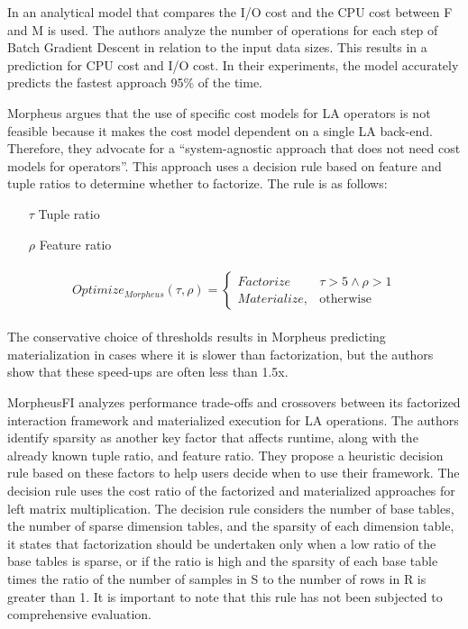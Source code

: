 In \cite{orion_learning_gen_lin_models} an analytical model that compares the I/O cost and the CPU cost between F and M is used. The authors analyze the number of operations for each step of Batch Gradient Descent in relation to the input data sizes. This results in a prediction for CPU cost and I/O cost. In their experiments, the model accurately predicts the fastest approach 95\% of the time.

Morpheus \cite{morpheus} argues that the use of specific cost models for LA operators is not feasible because it makes the cost model dependent on a single LA back-end. Therefore, they advocate for a “system-agnostic approach that does not need cost models for operators”. This approach uses a decision rule based on feature and tuple ratios to determine whether to factorize. The rule is as follows:

\begin{definition}
  \begin{itemize}
    \item[]
    \item[$\tau$] Tuple ratio
    \item[$\rho$] Feature ratio
  \end{itemize}

  \begin{align*}
    \begin{split}
      Optimize_{Morpheus}(\tau, \rho) =
      \begin{cases}
        Factorize    & \tau > 5 \wedge \rho > 1 \\
        Materialize, & \text{otherwise}
      \end{cases}
    \end{split}
  \end{align*}
\end{definition}

The conservative choice of thresholds results in Morpheus predicting materialization in cases where it is slower than factorization, but the authors show that these speed-ups are often less than 1.5x.

MorpheusFI \cite{MorpheusFI} analyzes performance trade-offs and crossovers between its factorized interaction framework and materialized execution for LA operations. The authors identify sparsity as another key factor that affects runtime, along with the already known tuple ratio, and feature ratio. They propose a heuristic decision rule based on these factors to help users decide when to use their framework. The decision rule uses the cost ratio of the factorized and materialized approaches for left matrix multiplication. The decision rule considers the number of base tables, the number of sparse dimension tables, and the sparsity of each dimension table, it states that factorization should be undertaken only when a low ratio of the base tables is sparse, or if the ratio is high and the sparsity of each base table times the ratio of the number of samples in S to the number of rows in R is greater than 1.  It is important to note that this rule has not been subjected to comprehensive evaluation.


